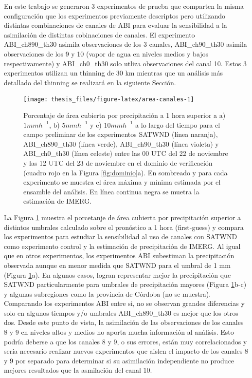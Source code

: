 \documentclass[12pt,oneside,a4paper]{reedthesis}
\begin{document}
En este trabajo se generaron 3 experimentos de prueba que comparten la misma configuración que los experimentos previamente descriptos pero utilizando distintas combinaciones de canales de ABI para evaluar la sensibilidad a la asimilación de distintas cobinaciones de canales. El experimento ABI\_ch890\_th30 asimila observaciones de los 3 canales, ABI\_ch90\_th30 asimila observaciones de los 9 y 10 (vapor de agua en niveles medios y bajos respectivamente) y ABI\_ch0\_th30 solo utliza observaciones del canal 10. Estos 3 experimentos utilizan un thinning de 30 km mientras que un análisis más detallado del thinning se realizará en la siguiente Sección.


\begin{figure}
\texttt{[image: thesis\_files/figure-latex/area-canales-1]} \caption{Porcentaje de área cubierta por precipitación a 1 hora superior a a) \(1 mmh^{-1}\), b) \(5 mmh^{-1}\) y c) \(10 mmh^{-1}\) a lo largo del tiempo para el campo preliminar de los experimentos SATWND (línea naranja), ABI\_ch890\_th30 (línea verde), ABI\_ch90\_th30 (línea violeta) y ABI\_ch0\_th30 (línea celeste) entre las 00 UTC del 22 de noviembre y las 12 UTC del 23 de noviembre en el dominio de verificación (cuadro rojo en la Figura \ref{fig:dominio}a). En sombreado y para cada experimento se muestra el área máxima y mínima estimada por el ensamble del análisis. En línea continua negra se muetra la estimación de IMERG.}\label{fig:area-canales}
\end{figure}
La Figura \ref{fig:area-canales} muestra el porcetanje de área cubierta por precipitación superior a distintos umbrales calculado sobre el pronóstico a 1 hora (first-guess) y compara los experimentos para estudiar la sensibilidad al uso de canales con SATWND como experimento control y la estimación de precipitación de IMERG. Al igual que en otros experimentos, los experimentos ABI subestiman la precipitación observada aunque en menor medida que SATWND para el umbral de 1 mm (Figura \ref{fig:area-canales}a). En algunos casos, logran representar mejor la precipitación que SATWND particularmente para umbrales de precipitación mayores (Figura \ref{fig:area-canales}b-c) y algunas subregiones como la provincia de Córdoba (no se muestra). Comparando los experimentos ABI entre si, no se observan grandes diferencias y solo en algunos tiempos y/o umbrales ABI\_ch890\_th30 es mejor que los otros dos. Desde este punto de vista, la asimilación de las observaciones de los canales 8 y 9 en niveles altos y medios no aporta mucha información al análisis. Esto podría deberse a que los canales 8 y 9, o sus errores, están muy correlacionados y sería necesario realizar nuevos experimentos que aislen el impacto de los canales 8 y 9 por separado para determinar si su asimilación independiente no produce mejores resultados que la asmilación del canal 10.
\end{document}

